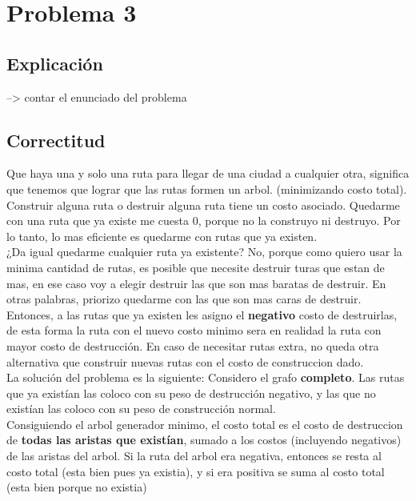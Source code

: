 
\section{Problema 3}
\subsection{Explicación}

--> contar el enunciado del problema

\subsection{Correctitud}

Que haya una y solo una ruta para llegar de una ciudad a cualquier otra, significa que tenemos que lograr que las rutas formen un arbol. (minimizando costo total). Construir alguna ruta o destruir alguna ruta tiene un costo asociado. Quedarme con una ruta que ya existe me cuesta 0, porque no la construyo ni destruyo. Por lo tanto, lo mas eficiente es quedarme con rutas que ya existen. \\

¿Da igual quedarme cualquier ruta ya existente? No, porque como quiero usar la minima cantidad de rutas, es posible que necesite destruir turas que estan de mas, en ese caso voy a elegir destruir las que son mas baratas de destruir. En otras palabras, priorizo quedarme con las que son mas caras de destruir. \\

Entonces, a las rutas que ya existen les asigno el \textbf{negativo} costo de destruirlas, de esta forma la ruta con el nuevo costo minimo sera en realidad la ruta con mayor costo de destrucción. En caso de necesitar rutas extra, no queda otra alternativa que construir nuevas rutas con el costo de construccion dado. \\

La solución del problema es la siguiente:
Considero el grafo \textbf{completo}. Las rutas que ya existían las coloco con su peso de destrucción negativo, y las que no existían las coloco con su peso de construcción normal. \\

Consiguiendo el arbol generador minimo, el costo total es el costo de destruccion de \textbf{todas las aristas que existían}, sumado a los costos (incluyendo negativos) de las aristas del arbol. Si la ruta del arbol era negativa, entonces se resta al costo total (esta bien pues ya existia), y si era positiva se suma al costo total (esta bien porque no existia) \\


